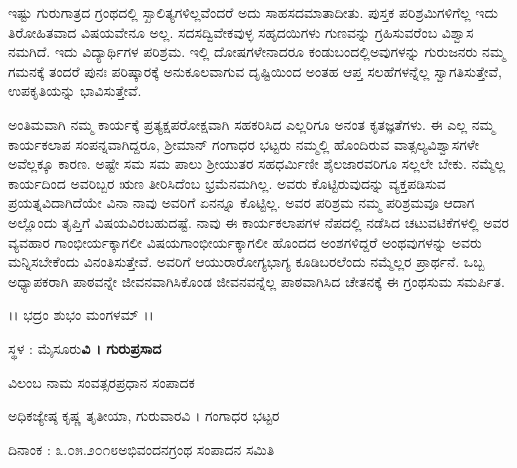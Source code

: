 {ಇಷ್ಟು ಗುರುಗಾತ್ರದ ಗ್ರಂಥದಲ್ಲಿ ಸ್ಖಾಲಿತ್ಯಗಳಿಲ್ಲವೆಂದರೆ ಅದು ಸಾಹಸದ\break ಮಾತಾದೀತು. ಪುಸ್ತಕ ಪರಿಶ್ರಮಿಗಳಿಗೆಲ್ಲ ಇದು ತಿರೋಹಿತವಾದ ವಿಷಯವೇನೂ ಅಲ್ಲ. ಸದಸದ್ವಿವೇಕವುಳ್ಳ ಸಹೃದಯಿಗಳು ಗುಣವನ್ನು ಗ್ರಹಿಸುವರೆಂಬ ವಿಶ್ವಾಸ \hbox{ನಮಗಿದೆ}. ಇದು ವಿದ್ಯಾರ್ಥಿಗಳ ಪರಿಶ್ರಮ. ಇಲ್ಲಿ ದೋಷಗಳೇನಾದರೂ ಕಂಡುಬಂದಲ್ಲಿ\break ಅವುಗಳನ್ನು ಗುರುಜನರು ನಮ್ಮ ಗಮನಕ್ಕೆ ತಂದರೆ ಪುನಃ ಪರಿಷ್ಕಾರಕ್ಕೆ ಅನುಕೂಲ\-ವಾಗುವ ದೃಷ್ಟಿಯಿಂದ ಅಂತಹ ಆಪ್ತ ಸಲಹೆಗಳನ್ನೆಲ್ಲ ಸ್ವಾಗತಿಸುತ್ತೇವೆ, ಉಪಕೃತಿಯನ್ನು ಭಾವಿಸುತ್ತೇವೆ.

ಅಂತಿಮವಾಗಿ \enginline{-} ನಮ್ಮ ಕಾರ್ಯಕ್ಕೆ ಪ್ರತ್ಯಕ್ಷ\enginline{-}ಪರೋಕ್ಷವಾಗಿ ಸಹಕರಿಸಿದ ಎಲ್ಲರಿಗೂ ಅನಂತ ಕೃತಜ್ಞತೆಗಳು. ಈ ಎಲ್ಲ ನಮ್ಮ ಕಾರ್ಯಕಲಾಪ ಸಂಪನ್ನವಾಗಿದ್ದರೂ, ಶ್ರೀಮಾನ್ ಗಂಗಾಧರ ಭಟ್ಟರು ನಮ್ಮಲ್ಲಿ ಹೊಂದಿರುವ ವಾತ್ಸಲ್ಯ\enginline{-}ವಿಶ್ವಾಸಗಳೇ ಅವೆಲ್ಲಕ್ಕೂ ಕಾರಣ. ಅಷ್ಟೇ ಸಮ \enginline{-} ಸಮ ಪಾಲು ಶ್ರೀಯುತರ ಸಹಧರ್ಮಿಣೀ \enginline{-} ಶೈಲಜಾರವರಿಗೂ \hbox{ಸಲ್ಲಲೇ} ಬೇಕು.  ನಮ್ಮೆಲ್ಲ ಕಾರ್ಯದಿಂದ ಅವರಿಬ್ಬರ ಋಣ ತೀರಿಸಿದೆಂಬ ಭ್ರಮೆ\break ನಮಗಿಲ್ಲ. ಅವರು ಕೊಟ್ಟಿರುವುದನ್ನು ವ್ಯಕ್ತಪಡಿಸುವ ಪ್ರಯತ್ನವಿದಾಗಿದೆಯೇ ವಿನಾ ನಾವು ಅವರಿಗೆ ಏನನ್ನೂ ಕೊಟ್ಟಿಲ್ಲ. ಅವರ ಪರಿಶ್ರಮ ನಮ್ಮ ಪರಿಶ್ರಮವೂ ಆದಾಗ ಅಲ್ಲೊಂದು ತೃಪ್ತಿಗೆ ವಿಷಯವಿರಬಹುದಷ್ಟೆ. ನಾವು  ಈ ಕಾರ್ಯಕಲಾಪಗಳ ನೆಪದಲ್ಲಿ ನಡೆಸಿದ ಚಟುವಟಿಕೆಗಳಲ್ಲಿ ಅವರ ವ್ಯವಹಾರ ಗಾಂಭೀರ್ಯಕ್ಕಾಗಲೀ ವಿಷಯ\break ಗಾಂಭೀರ್ಯಕ್ಕಾಗಲೀ ಹೊಂದದ ಅಂಶಗಳಿದ್ದರೆ ಅಂಥವುಗಳನ್ನು ಅವರು ಮನ್ನಿಸ\-ಬೇಕೆಂದು ವಿನಂತಿಸುತ್ತೇವೆ. ಅವರಿಗೆ ಆಯುರಾರೋಗ್ಯಭಾಗ್ಯ ಕೂಡಿಬರಲೆಂದು ನಮ್ಮೆಲ್ಲರ ಪ್ರಾರ್ಥನೆ. ಒಬ್ಬ ಅಧ್ಯಾಪಕರಾಗಿ ಪಾಠವನ್ನೇ ಜೀವನವಾಗಿಸಿಕೊಂಡ ಜೀವನವನ್ನೆಲ್ಲ ಪಾಠವಾಗಿಸಿದ ಚೇತನಕ್ಕೆ ಈ ಗ್ರಂಥಸುಮ ಸಮರ್ಪಿತ.
\bigskip

\centerline{ ।। ಭದ್ರಂ ಶುಭಂ ಮಂಗಳಮ್  ।।}
\bigskip

\noindent
ಸ್ಥಳ : ಮೈಸೂರು\hfill \textbf{ವಿ । ಗುರುಪ್ರಸಾದ}

\noindent	
ವಿಲಂಬ ನಾಮ ಸಂವತ್ಸರ\hfill ಪ್ರಧಾನ ಸಂಪಾದಕ

\noindent	
ಅಧಿಕಜ್ಯೇಷ್ಠ ಕೃಷ್ಣ ತೃತೀಯಾ, ಗುರುವಾರ\hfill ವಿ । ಗಂಗಾಧರ ಭಟ್ಟರ

\noindent
ದಿನಾಂಕ : ೩.೦೫.೨೦೧೮\hfill ಅಭಿವಂದನಗ್ರಂಥ ಸಂಪಾದನ ಸಮಿತಿ%

\articleend
}				
